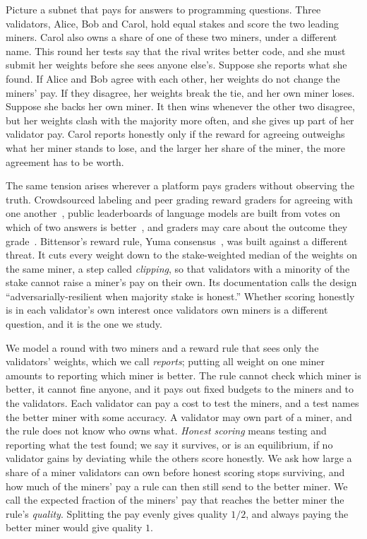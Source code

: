 \documentclass[sigconf,anonymous,review]{acmart}
\numberwithin{equation}{section}
\begin{document}
Picture a subnet that pays for answers to programming questions. Three
validators, Alice, Bob and Carol, hold equal stakes and score the two leading
miners. Carol also owns a share of one of these two miners, under a different
name. This round her tests say that the rival writes better code, and she must
submit her weights before she sees anyone else's. Suppose she reports what she
found. If Alice and Bob agree with each other, her weights do not change the
miners' pay. If they disagree, her weights break the tie, and her own miner
loses. Suppose she backs her own miner. It then wins whenever the other two
disagree, but her weights clash with the majority more often, and she gives up
part of her validator pay. Carol reports honestly only if the reward for
agreeing outweighs what her miner stands to lose, and the larger her share of
the miner, the more agreement has to be worth.

The same tension arises wherever a platform pays graders without observing the
truth. Crowdsourced labeling and peer grading reward graders for agreeing with
one another~\cite{miller2005peer,prelec2004bayesian,dasgupta2013crowdsourced,
ho2015incentivizing}, public leaderboards of language models are built from
votes on which of two answers is better~\cite{zheng2023judging,
chiang2024chatbot}, and graders may care about the outcome they
grade~\cite{freeman2017crowdsourced,goel2020peer}. Bittensor's reward rule,
Yuma consensus~\cite{bittensor2026yuma}, was built against a different threat.
It cuts every weight down to the stake-weighted median of the weights on the
same miner, a step called \emph{clipping}, so that validators with a minority
of the stake cannot raise a miner's pay on their own. Its documentation calls
the design ``adversarially-resilient when majority stake is honest.'' Whether
scoring honestly is in
each validator's own interest once validators own miners is a different
question, and it is the one we study.

We model a round with two miners and a reward rule that sees only the
validators' weights, which we call \emph{reports}; putting all weight on one
miner amounts to reporting which miner is better. The rule cannot check which
miner is better, it cannot fine anyone, and it pays out fixed budgets to the
miners and to the validators. Each validator can pay a cost to test the
miners, and a test names the better miner with some accuracy. A validator may
own part of a miner, and the rule does not know who owns what. \emph{Honest
scoring} means testing and reporting what the test found; we say it survives,
or is an equilibrium, if no validator gains by deviating while the others
score honestly. We ask how large a share of a miner validators can own before
honest scoring stops surviving, and how much of the miners' pay a rule can then
still send to the better miner. We call the expected fraction of the miners'
pay that reaches the better miner the rule's \emph{quality}. Splitting the pay
evenly gives quality $1/2$, and always paying the better miner would give
quality $1$.
\end{document}
